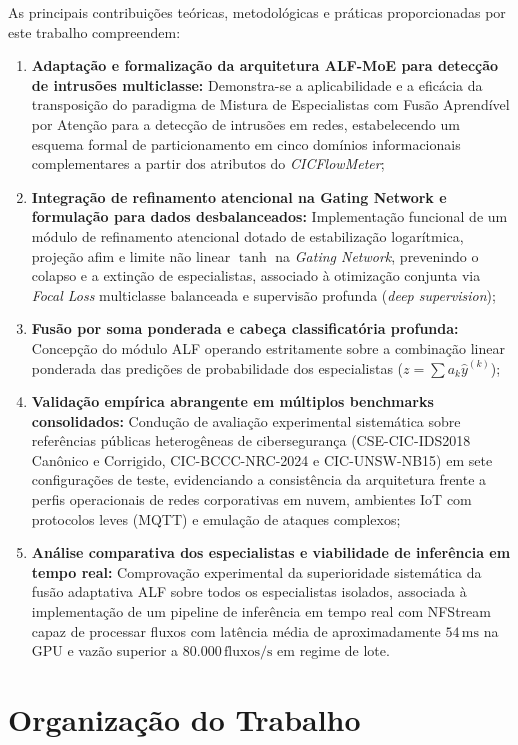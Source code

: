 As principais contribuições teóricas, metodológicas e práticas proporcionadas por este trabalho compreendem:
\begin{enumerate}
    \item \textbf{Adaptação e formalização da arquitetura ALF-MoE para detecção de intrusões multiclasse:} Demonstra-se a aplicabilidade e a eficácia da transposição do paradigma de Mistura de Especialistas com Fusão Aprendível por Atenção para a detecção de intrusões em redes, estabelecendo um esquema formal de particionamento em cinco domínios informacionais complementares a partir dos atributos do \emph{CICFlowMeter};
    \item \textbf{Integração de refinamento atencional na Gating Network e formulação para dados desbalanceados:} Implementação funcional de um módulo de refinamento atencional dotado de estabilização logarítmica, projeção afim e limite não linear $\tanh$ na \emph{Gating Network}, prevenindo o colapso e a extinção de especialistas, associado à otimização conjunta via \emph{Focal Loss} multiclasse balanceada e supervisão profunda (\emph{deep supervision});
    \item \textbf{Fusão por soma ponderada e cabeça classificatória profunda:} Concepção do módulo ALF operando estritamente sobre a combinação linear ponderada das predições de probabilidade dos especialistas ($z = \sum a_k \hat{y}^{(k)}$);
    \item \textbf{Validação empírica abrangente em múltiplos benchmarks consolidados:} Condução de avaliação experimental sistemática sobre referências públicas heterogêneas de cibersegurança (CSE-CIC-IDS2018 Canônico e Corrigido, CIC-BCCC-NRC-2024 e CIC-UNSW-NB15) em sete configurações de teste, evidenciando a consistência da arquitetura frente a perfis operacionais de redes corporativas em nuvem, ambientes IoT com protocolos leves (MQTT) e emulação de ataques complexos;
    \item \textbf{Análise comparativa dos especialistas e viabilidade de inferência em tempo real:} Comprovação experimental da superioridade sistemática da fusão adaptativa ALF sobre todos os especialistas isolados, associada à implementação de um pipeline de inferência em tempo real com NFStream capaz de processar fluxos com latência média de aproximadamente $54\,\mathrm{ms}$ na GPU e vazão superior a $80.000\,\mathrm{fluxos/s}$ em regime de lote.
\end{enumerate}

\section{Organização do Trabalho}
\label{sec:organizacao}

